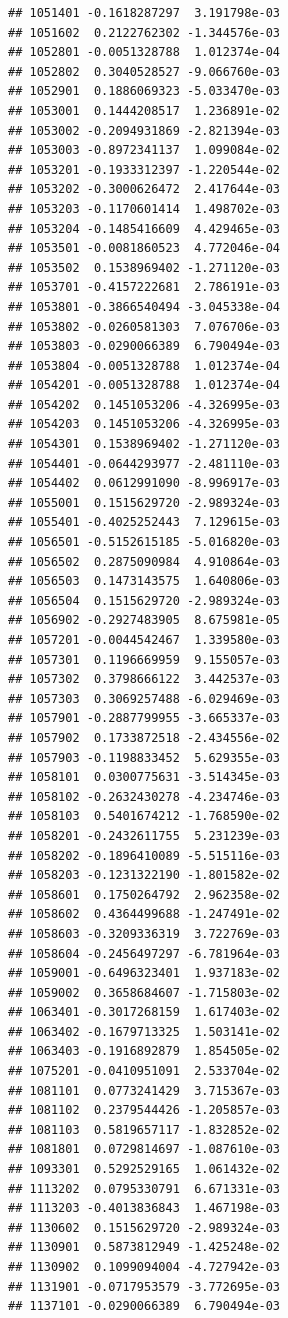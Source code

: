 \begin{frame}[fragile]
\begin{verbatim}
## 1051401 -0.1618287297  3.191798e-03
## 1051602  0.2122762302 -1.344576e-03
## 1052801 -0.0051328788  1.012374e-04
## 1052802  0.3040528527 -9.066760e-03
## 1052901  0.1886069323 -5.033470e-03
## 1053001  0.1444208517  1.236891e-02
## 1053002 -0.2094931869 -2.821394e-03
## 1053003 -0.8972341137  1.099084e-02
## 1053201 -0.1933312397 -1.220544e-02
## 1053202 -0.3000626472  2.417644e-03
## 1053203 -0.1170601414  1.498702e-03
## 1053204 -0.1485416609  4.429465e-03
## 1053501 -0.0081860523  4.772046e-04
## 1053502  0.1538969402 -1.271120e-03
## 1053701 -0.4157222681  2.786191e-03
## 1053801 -0.3866540494 -3.045338e-04
## 1053802 -0.0260581303  7.076706e-03
## 1053803 -0.0290066389  6.790494e-03
## 1053804 -0.0051328788  1.012374e-04
## 1054201 -0.0051328788  1.012374e-04
## 1054202  0.1451053206 -4.326995e-03
## 1054203  0.1451053206 -4.326995e-03
## 1054301  0.1538969402 -1.271120e-03
## 1054401 -0.0644293977 -2.481110e-03
## 1054402  0.0612991090 -8.996917e-03
## 1055001  0.1515629720 -2.989324e-03
## 1055401 -0.4025252443  7.129615e-03
## 1056501 -0.5152615185 -5.016820e-03
## 1056502  0.2875090984  4.910864e-03
## 1056503  0.1473143575  1.640806e-03
## 1056504  0.1515629720 -2.989324e-03
## 1056902 -0.2927483905  8.675981e-05
## 1057201 -0.0044542467  1.339580e-03
## 1057301  0.1196669959  9.155057e-03
## 1057302  0.3798666122  3.442537e-03
## 1057303  0.3069257488 -6.029469e-03
## 1057901 -0.2887799955 -3.665337e-03
## 1057902  0.1733872518 -2.434556e-02
## 1057903 -0.1198833452  5.629355e-03
## 1058101  0.0300775631 -3.514345e-03
## 1058102 -0.2632430278 -4.234746e-03
## 1058103  0.5401674212 -1.768590e-02
## 1058201 -0.2432611755  5.231239e-03
## 1058202 -0.1896410089 -5.515116e-03
## 1058203 -0.1231322190 -1.801582e-02
## 1058601  0.1750264792  2.962358e-02
## 1058602  0.4364499688 -1.247491e-02
## 1058603 -0.3209336319  3.722769e-03
## 1058604 -0.2456497297 -6.781964e-03
## 1059001 -0.6496323401  1.937183e-02
## 1059002  0.3658684607 -1.715803e-02
## 1063401 -0.3017268159  1.617403e-02
## 1063402 -0.1679713325  1.503141e-02
## 1063403 -0.1916892879  1.854505e-02
## 1075201 -0.0410951091  2.533704e-02
## 1081101  0.0773241429  3.715367e-03
## 1081102  0.2379544426 -1.205857e-03
## 1081103  0.5819657117 -1.832852e-02
## 1081801  0.0729814697 -1.087610e-03
## 1093301  0.5292529165  1.061432e-02
## 1113202  0.0795330791  6.671331e-03
## 1113203 -0.4013836843  1.467198e-03
## 1130602  0.1515629720 -2.989324e-03
## 1130901  0.5873812949 -1.425248e-02
## 1130902  0.1099094004 -4.727942e-03
## 1131901 -0.0717953579 -3.772695e-03
## 1137101 -0.0290066389  6.790494e-03

\end{verbatim}
\end{frame}
